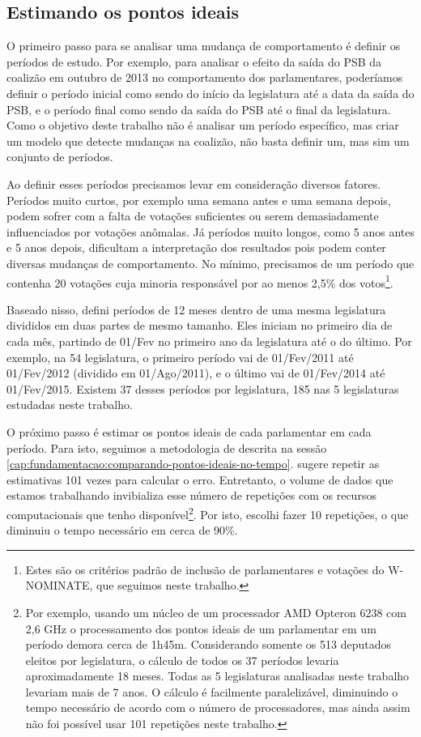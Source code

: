 \documentclass[a4paper,titlepage]{ppgi}\usepackage[]{graphicx}\usepackage[]{color}
\begin{document}
\subsection{Estimando os pontos ideais}

O primeiro passo para se analisar uma mudança de comportamento é definir os
períodos de estudo. Por exemplo, para analisar o efeito da saída do PSB da
coalizão em outubro de 2013 no comportamento dos parlamentares, poderíamos
definir o período inicial como sendo do início da legislatura até a data da
saída do PSB, e o período final como sendo da saída do PSB até o final da
legislatura. Como o objetivo deste trabalho não é analisar um período
específico, mas criar um modelo que detecte mudanças na coalizão, não basta
definir um, mas sim um conjunto de períodos.

Ao definir esses períodos precisamos levar em consideração diversos fatores.
Períodos muito curtos, por exemplo uma semana antes e uma semana depois, podem
sofrer com a falta de votações suficientes ou serem demasiadamente
influenciados por votações anômalas. Já períodos muito longos, como 5 anos
antes e 5 anos depois, dificultam a interpretação dos resultados pois podem
conter diversas mudanças de comportamento. No mínimo, precisamos de um período
que contenha 20 votações cuja minoria responsável por ao menos 2,5\% dos
votos\footnote{Estes são os critérios padrão de inclusão de parlamentares e
votações do W-NOMINATE, que seguimos neste trabalho.}.

Baseado nisso, defini períodos de 12 meses dentro de uma mesma legislatura
divididos em duas partes de mesmo tamanho. Eles iniciam no primeiro dia de cada
mês, partindo de 01/Fev no primeiro ano da legislatura até o do último. Por
exemplo, na 54\textordfeminine{} legislatura, o primeiro período vai de
01/Fev/2011 até 01/Fev/2012 (dividido em 01/Ago/2011), e o último vai de
01/Fev/2014 até 01/Fev/2015. Existem 37 desses períodos por legislatura, 185
nas 5 legislaturas estudadas neste trabalho.

O próximo passo é estimar os pontos ideais de cada parlamentar em cada período.
Para isto, seguimos a metodologia de  descrita na sessão
\ref{cap:fundamentacao:comparando-pontos-ideais-no-tempo}.
\citeauthor{Poole2005} sugere repetir as estimativas 101 vezes para calcular o
erro. Entretanto, o volume de dados que estamos trabalhando invibializa esse
número de repetições com os recursos computacionais que tenho
disponível\footnote{Por exemplo, usando um núcleo de um processador AMD
Opteron\texttrademark{} 6238 com 2,6 GHz o processamento dos pontos ideais de
um parlamentar em um período demora cerca de 1h45m. Considerando somente os 513
deputados eleitos por legislatura, o cálculo de todos os 37 períodos levaria
aproximadamente 18 meses. Todas as 5 legislaturas analisadas neste trabalho
levariam mais de 7 anos. O cálculo é facilmente paralelizável, diminuindo o
tempo necessário de acordo com o número de processadores, mas ainda assim não
foi possível usar 101 repetições neste trabalho.}. Por isto, escolhi fazer 10
repetições, o que diminuiu o tempo necessário em cerca de 90\%.
\end{document}
